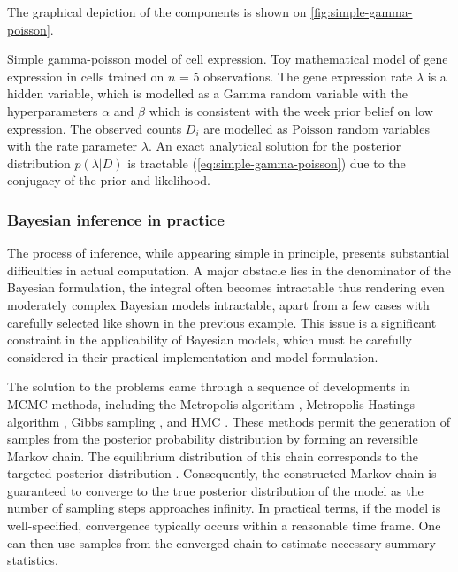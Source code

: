 The graphical depiction of the components is shown on \cref{fig:simple-gamma-poisson}.

    {Simple gamma-poisson model of cell expression.}
    {Toy mathematical model of gene expression in cells trained on $n$ = 5 observations. The gene expression rate $\lambda$ is a hidden variable, which is modelled as a $\text{Gamma}$ random variable with the hyperparameters $\alpha$ and $\beta$ which is consistent with the week prior belief on low expression. The observed counts $D_i$ are modelled as $\text{Poisson}$ random variables with the rate parameter $\lambda$. An exact analytical solution for the posterior distribution $p(\lambda|D)$ is tractable (\cref{eq:simple-gamma-poisson}) due to the conjugacy of the prior and likelihood.}

\subsubsection*{Bayesian inference in practice}
The process of inference, while appearing simple in principle, presents substantial difficulties in actual computation. A major obstacle lies in the denominator of the Bayesian formulation, the integral often becomes intractable  thus rendering even moderately complex Bayesian models intractable, apart from a few cases with carefully selected  like shown in the previous example. This issue is a significant constraint in the applicability of Bayesian models, which must be carefully considered in their practical implementation and model formulation.

The solution to the problems came through a sequence of developments in \ac{MCMC} methods, including the Metropolis algorithm \parencite{Rosenbluth1953-gu}, Metropolis-Hastings algorithm \parencite{Hastings1970-mb}, Gibbs sampling \parencite{Geman1984-nk}, and \acf{HMC} \parencite{Duane1987-gu}. These methods permit the generation of samples from the posterior probability distribution by forming an reversible Markov chain. The equilibrium distribution of this chain corresponds to the targeted posterior distribution \parencite{Roberts2004-op}. Consequently, the constructed Markov chain is guaranteed to converge to the true posterior distribution of the model as the number of sampling steps approaches infinity. In practical terms, if the model is well-specified, convergence typically occurs within a reasonable time frame. One can then use samples from the converged chain to estimate necessary summary statistics.

